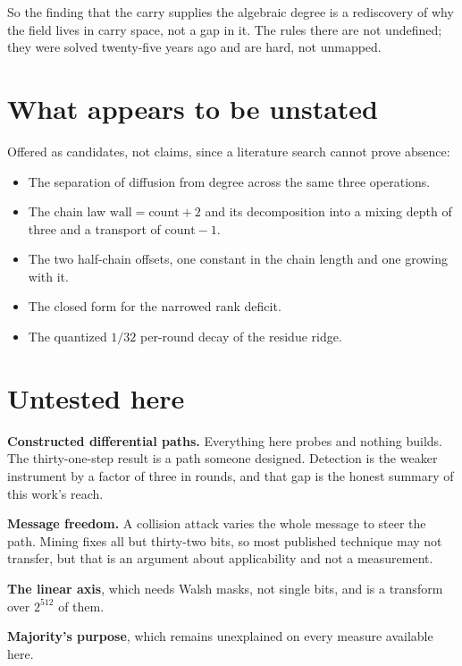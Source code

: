 So the finding that the carry supplies the algebraic degree is a rediscovery of why the field lives in carry space, not a gap in it. The rules there are not undefined; they were solved twenty-five years ago and are hard, not unmapped.

\section{What appears to be unstated}

Offered as candidates, not claims, since a literature search cannot prove absence:

\begin{itemize}
  \item The separation of diffusion from degree across the same three operations.
  \item The chain law \(\mathrm{wall} = \mathrm{count} + 2\) and its decomposition into a mixing depth of three and a transport of \(\mathrm{count} - 1\).
  \item The two half-chain offsets, one constant in the chain length and one growing with it.
  \item The closed form for the narrowed rank deficit.
  \item The quantized \(1/32\) per-round decay of the residue ridge.
\end{itemize}

\section{Untested here}

\textbf{Constructed differential paths.} Everything here probes and nothing builds. The thirty-one-step result is a path someone designed. Detection is the weaker instrument by a factor of three in rounds, and that gap is the honest summary of this work's reach.

\textbf{Message freedom.} A collision attack varies the whole message to steer the path. Mining fixes all but thirty-two bits, so most published technique may not transfer, but that is an argument about applicability and not a measurement.

\textbf{The linear axis}, which needs Walsh masks, not single bits, and is a transform over \(2^{512}\) of them.

\textbf{Majority's purpose}, which remains unexplained on every measure available here.
